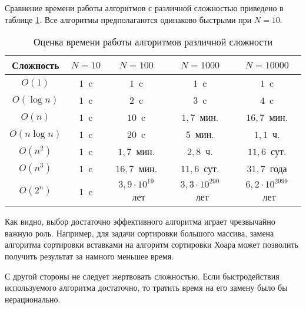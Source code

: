 Сравнение времени работы алгоритмов с различной сложностью приведено в
таблице \ref{tbl:complexity}. Все алгоритмы предполагаются одинаково
быстрыми при $N=10$.

\begin{table}
  \begin{centering}
    \begin{tabular}{|c|c|c|c|c|}
      \hline 
      Сложность & $N=10$ & $N=100$ & $N=1000$ & $N=10000$\\
      \hline 
      \hline 
      $O(1)$       & $1$~c & $1$~c                   & $1$~c                    & $1$~c\\
      \hline 
      $O(\log n)$  & $1$~c & $2$~c                   & $3$~c                    & $4$~c\\
      \hline 
      $O(n)$       & $1$~c & $10$~c                  & $1{,}7$~мин.             & $16{,}7$~мин.\\
      \hline 
      $O(n\log n)$ & $1$~c & $20$~c                  & $5$~мин.                 & $1{,}1$~ч.\\
      \hline 
      $O(n^{2})$   & $1$~c & $1{,}7$~мин.            & $2{,}8$~ч.               & $11{,}6$~сут.\\
      \hline 
      $O(n^{3})$   & $1$~c & $16{,}7$~мин.           & $11{,}6$~сут.            & $31{,}7$~года\\
      \hline 
      $O(2^{n})$   & $1$~c & $3{,}9\cdot10^{19}$~лет & $3{,}3\cdot10^{290}$~лет & $6{,}2\cdot10^{2999}$~лет\\
      \hline 
    \end{tabular}
    \par
  \end{centering}
    
  \caption{Оценка времени работы алгоритмов различной сложности}
  \label{tbl:complexity}
\end{table}

Как видно, выбор достаточно эффективного алгоритма играет чрезвычайно
важную роль. Например, для задачи сортировки большого массива, замена
алгоритма сортировки вставками на алгоритм сортировки Хоара может
позволить получить результат за намного меньшее время.

С другой стороны не следует жертвовать сложностью. Если быстродействия
используемого алгоритма достаточно, то тратить время на его замену
было бы нерационально.
